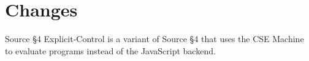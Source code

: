 





\section{Changes}




Source \S 4 Explicit-Control is a variant of Source \S 4 that uses the CSE Machine to evaluate programs instead of the JavaScript backend.





\newpage









































\newpage



\newpage



    
